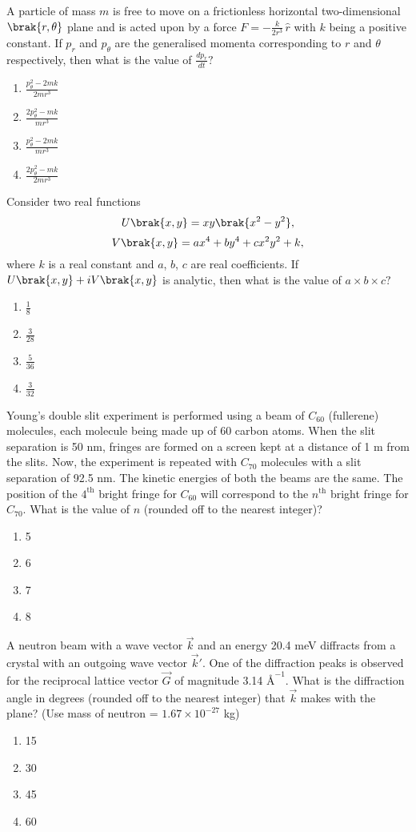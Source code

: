 \item A particle of mass $m$ is free to move on a frictionless horizontal two-dimensional $\brak{r, \theta}$ plane and is acted upon by a force $F = -\frac{k}{2r^3} \, \hat{r}$ with $k$ being a positive constant. If $p_r$ and $p_\theta$ are the generalised momenta corresponding to $r$ and $\theta$ respectively, then what is the value of $\frac{dp_r}{dt}?$
\begin{enumerate}
\item $\frac{p_{\theta}^2 - 2mk}{2mr^3}$
\item $\frac{2p_{\theta}^2 - mk}{mr^3}$
\item $\frac{p_{\theta}^2 - 2mk}{mr^3}$
\item $\frac{2p_{\theta}^2 - mk}{2mr^3}$
\end{enumerate}
\item Consider two real functions 
\[
U\brak{x, y} = x y \brak{x^2 - y^2},
\]
\[
V\brak{x, y} = a x^4 + b y^4 + c x^2 y^2 + k,
\]
where $k$ is a real constant and $a$, $b$, $c$ are real coefficients. If $U\brak{x, y} + i V\brak{x, y}$ is analytic, then what is the value of $a \times b \times c?$
\begin{enumerate}
\item $\frac{1}{8}$
\item $\frac{3}{28}$
\item $\frac{5}{36}$
\item $\frac{3}{32}$
\end{enumerate}
\item Young’s double slit experiment is performed using a beam of $C_{60}$ (fullerene) molecules, each molecule being made up of 60 carbon atoms. When the slit separation is 50 nm, fringes are formed on a screen kept at a distance of 1 m from the slits. Now, the experiment is repeated with $C_{70}$ molecules with a slit separation of 92.5 nm. The kinetic energies of both the beams are the same. The position of the $4^{\text{th}}$ bright fringe for $C_{60}$ will correspond to the $n^{\text{th}}$ bright fringe for $C_{70}$. What is the value of $n$ (rounded off to the nearest integer)?
\begin{enumerate}
\item 5
\item 6
\item 7
\item 8
\end{enumerate}
\item A neutron beam with a wave vector $\vec{k}$ and an energy 20.4 meV diffracts from a crystal with an outgoing wave vector $\vec{k}'$. One of the diffraction peaks is observed for the reciprocal lattice vector $\vec{G}$ of magnitude 3.14 $Å^{-1}$. What is the diffraction angle in degrees (rounded off to the nearest integer) that $\vec{k}$ makes with the plane? (Use mass of neutron = $1.67 \times 10^{-27}$ kg)\begin{enumerate}
\item 15 
\item 30
\item 45
\item 60
\end{enumerate}
